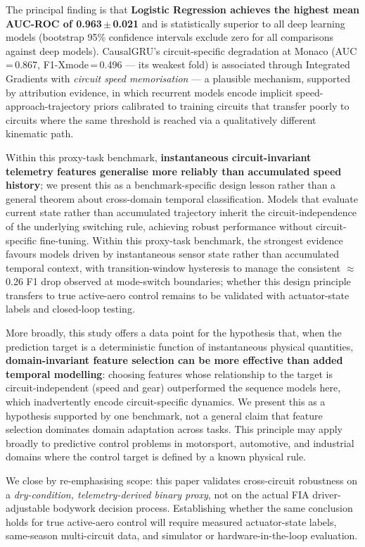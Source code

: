 \documentclass[conference,a4paper]{IEEEtran}
\begin{document}
The principal finding is that \textbf{Logistic Regression achieves the highest
mean AUC-ROC of 0.963\,$\pm$\,0.021} and is statistically superior to all deep
learning models (bootstrap 95\% confidence intervals exclude zero for all comparisons
against deep models).
CausalGRU's circuit-specific degradation at Monaco (AUC\,=\,0.867, F1-Xmode\,=\,0.496 —
its weakest fold) is associated through Integrated Gradients with \emph{circuit speed
memorisation} — a plausible mechanism, supported by attribution evidence, in which
recurrent models encode implicit speed-approach-trajectory priors calibrated to training
circuits that transfer poorly to circuits where the same threshold is reached
via a qualitatively different kinematic path.

Within this proxy-task benchmark, \textbf{instantaneous circuit-invariant telemetry
features generalise more reliably than accumulated speed history}; we present this as a
benchmark-specific design lesson rather than a general theorem about cross-domain temporal
classification. Models that evaluate current state rather than accumulated trajectory
inherit the circuit-independence of the underlying switching rule, achieving robust
performance without circuit-specific fine-tuning.
Within this proxy-task benchmark, the strongest evidence favours models driven by
instantaneous sensor state rather than accumulated temporal context, with
transition-window hysteresis to manage the consistent $\approx$0.26 F1 drop observed at
mode-switch boundaries; whether this design principle transfers to true active-aero
control remains to be validated with actuator-state labels and closed-loop testing.

More broadly, this study offers a data point for the hypothesis that, when the prediction
target is a deterministic function of instantaneous physical quantities,
\textbf{domain-invariant feature selection can be more effective than added temporal
modelling}: choosing features whose relationship to the target is circuit-independent
(speed and gear) outperformed the sequence models here, which inadvertently encode
circuit-specific dynamics. We present this as a hypothesis supported by one benchmark,
not a general claim that feature selection dominates domain adaptation across tasks.
This principle may apply broadly to predictive control problems in motorsport, automotive,
and industrial domains where the control target is defined by a known physical rule.

We close by re-emphasising scope: this paper validates cross-circuit robustness on a
\emph{dry-condition, telemetry-derived binary proxy}, not on the actual FIA driver-adjustable
bodywork decision process. Establishing whether the same conclusion holds for true
active-aero control will require measured actuator-state labels, same-season multi-circuit
data, and simulator or hardware-in-the-loop evaluation.
\end{document}
